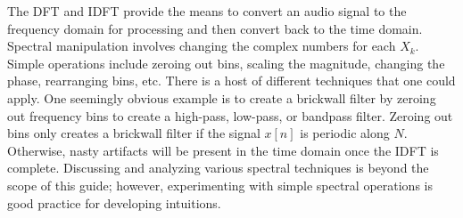 The DFT and IDFT provide the means to convert an audio signal to the frequency domain for processing and
then convert back to the time domain.  Spectral manipulation involves changing the complex numbers for
each $X_k$.  Simple operations include zeroing out bins, scaling the magnitude, changing the phase, rearranging
bins, etc.  There is a host of different techniques that one could apply.  One seemingly obvious example is
to create a brickwall filter by zeroing out frequency bins to create a high-pass, low-pass, or bandpass filter.
Zeroing out bins only creates a brickwall filter if the signal $x[n]$ is periodic along $N$.  Otherwise, nasty artifacts
will be present in the time domain once the IDFT is complete.  Discussing and analyzing various spectral 
techniques is beyond the scope of this guide; however, experimenting with simple spectral operations is good 
practice for developing intuitions.